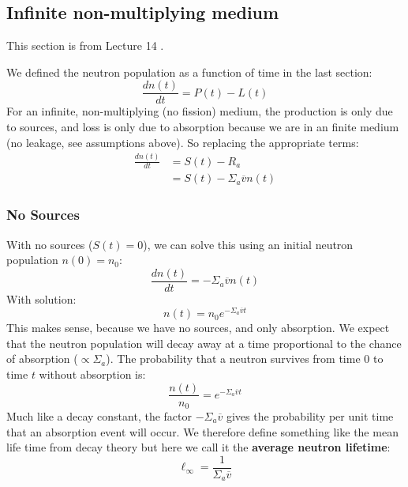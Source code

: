 \documentclass[letter]{article}
\begin{document}
\subsection{Infinite non-multiplying medium}
This section is from Lecture 14 \cite{lecture}.

\vspace{10pt}
We defined the neutron population
as a function of time in the last section:
\begin{equation*}
  \frac{dn(t)}{dt}=P(t)-L(t)
\end{equation*}
For an infinite, non-multiplying (no fission) medium, the production
is only due to sources, and loss is only due to absorption because we
are in an finite medium (no leakage, see assumptions above). So
replacing the appropriate terms:
\begin{equation*}
  \begin{split}
    \frac{dn(t)}{dt}&=S(t)-R_a \\
    &=S(t)-\Sigma_a\overline{v}n(t)
  \end{split}
\end{equation*}

\subsubsection{No Sources}

With no sources ($S(t)=0$), we can solve this using an initial neutron population
$n(0)=n_0$:
\begin{equation*}
    \frac{dn(t)}{dt}=-\Sigma_a\overline{v}n(t)
\end{equation*}
With solution:
\begin{equation*}
      n(t) = n_0e^{-\Sigma_a\overline{v}t}
\end{equation*}
This makes sense, because we have no sources, and only absorption. We
expect that the neutron population will decay away at a time
proportional to the chance of absorption ($\propto\Sigma_a$). The
probability that a neutron survives from time 0 to time $t$ without
absorption is:
\begin{equation*}
  \frac{n(t)}{n_0}=e^{-\Sigma_a\overline{v}t}
\end{equation*}
Much like a decay constant, the factor $-\Sigma_a\overline{v}$ gives
the probability per unit time that an absorption event will occur. We
therefore define something like the mean life time from decay theory
but here we call it the \textbf{average neutron lifetime}:
\begin{equation*}
  \ell_\infty = \frac{1}{\Sigma_a\overline{v}}
\end{equation*}
\end{document}
